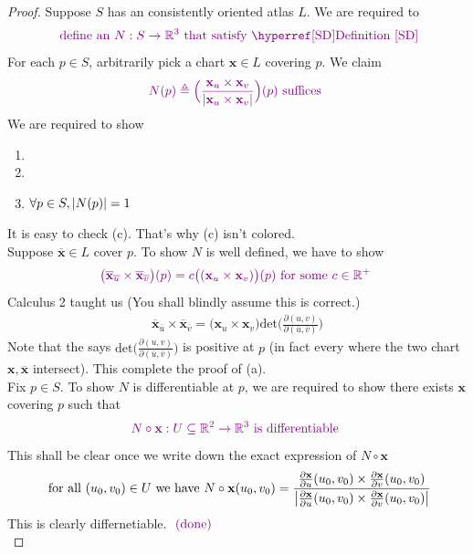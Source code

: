 \documentclass{report}
\begin{document}
\begin{proof}
Suppose $S$ has an consistently oriented atlas  $L$. We are required to 
 \begin{align*}
\vi{\text{ define an $N:S\rightarrow \R^3$ that satisfy \myref{Definition}{SD}}}
\end{align*}
For each $p \in S$, arbitrarily pick a chart $\textbf{x}\in L$ covering $p$. We claim
\begin{align*}
  \textcolor{violet}{N(p)\triangleq \Big(\frac{\textbf{x}_u\times \textbf{x}_v}{\left|\textbf{x}_u \times \textbf{x}_v\right|} \Big)(p)\text{ suffices }}
\end{align*}
We are required to show 
\begin{enumerate}[label=(\alph*)]
  \item {}
  \item {}
  \item  $\forall p \in S, \left|N(p)\right|=1$ 
\end{enumerate}
It is easy to check (c). That's why (c) isn't colored.\\

Suppose $\overline{\textbf{x}}\in L$ cover $p$. To show $N$ is well defined, we have to show 
\begin{align*}
\textcolor{violet}{\big(\overline{\textbf{x}}_{\overline{u}}\times \overline{\textbf{x}}_{\overline{v}} \big)(p)=c\big((\textbf{x}_u \times \textbf{x}_v) \big)(p) \text{ for some $c\in\mathbb{R}^+$ }}
\end{align*}
Calculus 2 taught us (You shall blindly assume this is correct.)
\begin{align}
\label{CTYb}
\overline{\textbf{x}}_{\overline{u}}\times \overline{\textbf{x}}_{\overline{v}}= \big(\textbf{x}_u \times \textbf{x}_v \big) \text{det}\Big(\frac{\partial  (u,v)}{\partial (\overline{u},\overline{v})} \Big) 
\end{align}
Note that the  says $\text{det}\Big(\frac{\partial  (u,v)}{\partial (\overline{u},\overline{v})} \Big) $ is positive at $p$ (in fact every where the two chart $\textbf{x},\overline{\textbf{x}}$ intersect). This complete the proof of  (a).\\

Fix $p\in  S$. To show $N$ is differentiable at $p$, we are required to show there exists $\textbf{x}$ covering $p$ such that 
\begin{align*}
  \textcolor{violet}{N\circ \textbf{x}:U\subseteq\mathbb{R}^2 \rightarrow \mathbb{R}^3\text{ is differentiable }}
\end{align*}
This shall be clear once we write down the exact expression of $N\circ \textbf{x}$
\begin{align*}
\text{ for all $(u_0,v_0)\in U$ we have }N\circ \textbf{x}(u_0,v_0)= \frac{\frac{\partial \textbf{x} }{\partial u}(u_0,v_0)\times \frac{\partial \textbf{x}}{\partial v}(u_0,v_0)}{\left|\frac{\partial \textbf{x} }{\partial u}(u_0,v_0)\times \frac{\partial \textbf{x}}{\partial v}(u_0,v_0)\right|}
\end{align*}
This is clearly differnetiable. $\textcolor{violet}{\text{ (done) }}$ \\


\end{proof}
\end{document}
